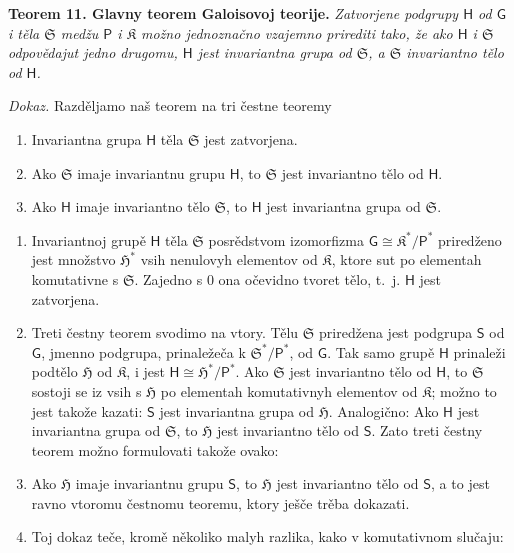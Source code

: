 \documentclass[11pt]{article}
\begin{document}
\textbf{Teorem 11. Glavny teorem Galoisovoj teorije.} \emph{Zatvorjene podgrupy \(\mathsf{H}\) od \(\mathsf{G}\) i těla \(\mathfrak S\) medžu \(\mathsf P\) i \(\mathfrak K\) možno jednoznačno vzajemno prirediti tako, že ako \(\mathsf{H}\) i \(\mathfrak S\) odpovědajut jedno drugomu, \(\mathsf{H}\) jest invariantna grupa od \(\mathfrak S\), a \(\mathfrak S\) invariantno tělo od \(\mathsf{H}\).}

\emph{Dokaz.} Razděljamo naš teorem na tri čestne teoremy
\begin{enumerate}
\item Invariantna grupa \(\mathsf{H}\) těla \(\mathfrak S\) jest zatvorjena.
\item Ako \(\mathfrak S\) imaje invariantnu grupu \(\mathsf{H}\), to \(\mathfrak S\) jest invariantno tělo od \(\mathsf{H}\).
\item Ako \(\mathsf{H}\) imaje invariantno tělo \(\mathfrak S\), to \(\mathsf{H}\) jest invariantna grupa od \(\mathfrak S\).
\end{enumerate}

\begin{enumerate}
\item Invariantnoj grupě \(\mathsf{H}\) těla \(\mathfrak S\) posrědstvom izomorfizma \(\mathsf{G}\cong \mathfrak K^*/\mathsf P^*\) priredženo jest množstvo \(\mathfrak H^*\) vsih nenulovyh elementov od \(\mathfrak K\), ktore sut po elementah komutativne s \(\mathfrak S\). Zajedno s 0 ona očevidno tvoret tělo, t.~j. \(\mathsf{H}\) jest zatvorjena.

\item Treti čestny teorem svodimo na vtory. Tělu \(\mathfrak S\) priredžena jest podgrupa \(\mathsf{S}\) od \(\mathsf{G}\), jmenno podgrupa, prinaležeča k \(\mathfrak S^*/\mathsf P^*\), od \(\mathsf{G}\). Tak samo grupě \(\mathsf{H}\) prinaleži podtělo \(\mathfrak H\) od \(\mathfrak K\), i jest \(\mathsf{H}\cong \mathfrak H^*/\mathsf P^*\). Ako \(\mathfrak S\) jest invariantno tělo od \(\mathsf{H}\), to \(\mathfrak S\) sostoji se iz vsih s \(\mathfrak H\) po elementah komutativnyh elementov od \(\mathfrak K\); možno to jest takože kazati: \(\mathsf{S}\) jest invariantna grupa od \(\mathfrak H\). Analogično: Ako \(\mathsf{H}\) jest invariantna grupa od \(\mathfrak S\), to \(\mathfrak H\) jest invariantno tělo od \(\mathsf{S}\). Zato treti čestny teorem možno formulovati takože ovako:

\item[\(3'\).] Ako \(\mathfrak H\) imaje invariantnu grupu \(\mathsf{S}\), to \(\mathfrak H\) jest invariantno tělo od \(\mathsf{S}\), a to jest ravno vtoromu čestnomu teoremu, ktory ješče trěba dokazati.

\item[3.] Toj dokaz teče, kromě několiko malyh razlika, kako v komutativnom slučaju:
\end{enumerate}
\end{document}
